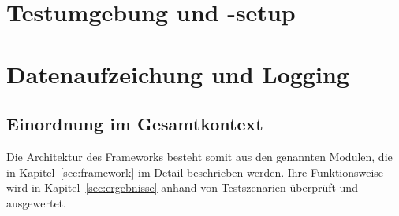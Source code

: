 







\section{Testumgebung und -setup}
\label{sec:aufbauTestszenario}


\section{Datenaufzeichung und Logging}



\subsection*{Einordnung im Gesamtkontext}
Die Architektur des Frameworks besteht somit aus den genannten Modulen, die in
Kapitel~\ref{sec:framework} im Detail beschrieben werden. Ihre Funktionsweise wird in
Kapitel~\ref{sec:ergebnisse} anhand von Testszenarien überprüft und ausgewertet.
